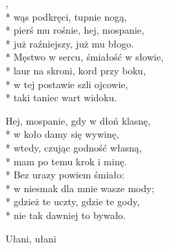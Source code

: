 
\begin{lyrics}[longestline={\vin Męstwo w sercu, śmiałość w słowie,}]

,\\*
wąs podkręci, tupnie nogą,\\*
pierś mu rośnie, hej, mospanie,\\*
już raźniejszy, już mu błogo.\\*
\medskip
\vin Męstwo w sercu, śmiałość w słowie,\\*
\vin laur na skroni, kord przy boku,\\*
\vin w tej postawie szli ojcowie,\\*
\vin taki taniec wart widoku.

Hej, mospanie, gdy w dłoń klasnę,\\*
w koło damy się wywinę,\\*
wtedy, czując godność własną,\\*
mam po temu krok i minę.\\*
\medskip
\vin Bez urazy powiem śmiało:\\*
\vin w niesmak dla mnie wasze mody;\\*
\vin gdzież te uczty, gdzie te gody,\\*
\vin nie tak dawniej to bywało.
\end{lyrics}



\song
{Ułani, ułani}

